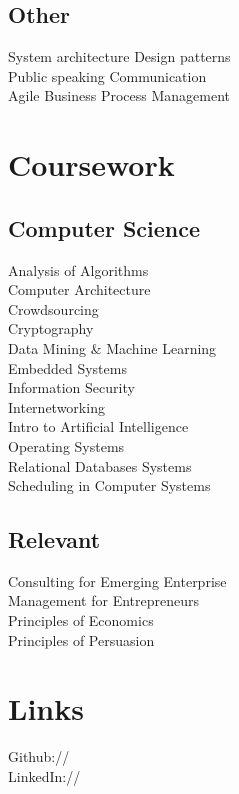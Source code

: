 \documentclass[]{deedy-resume-openfont}
\begin{document}
\begin{minipage}[t]{0.33\textwidth}
\subsection{Other}
System architecture \textbullet{} Design patterns\\
Public speaking \textbullet{} Communication\\
Agile Business Process Management
\sectionsep


\section{Coursework}
\subsection{Computer Science}
Analysis of Algorithms \\
Computer Architecture \\
Crowdsourcing \\
Cryptography \\
Data Mining \& Machine Learning \\
Embedded Systems \\
Information Security \\
Internetworking \\
Intro to Artificial Intelligence \\
Operating Systems \\
Relational Databases Systems \\
Scheduling in Computer Systems \\
\sectionsep

\subsection{Relevant}
Consulting for Emerging Enterprise \\
Management for Entrepreneurs \\
Principles of Economics \\
Principles of Persuasion \\
\sectionsep




\section{Links} 
Github:// \href{https://github.com/thenamanpat}{} \\
LinkedIn://  \href{https://www.linkedin.com/in/thenamanpat}{} \\
\sectionsep

%
%

\end{minipage} 
\end{document}
